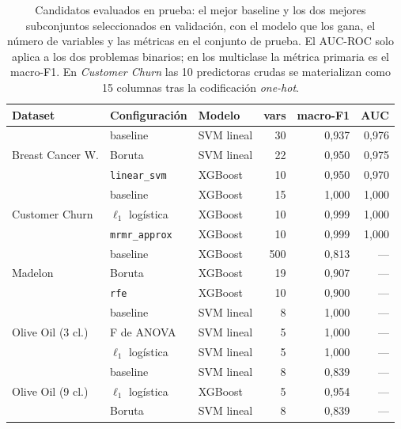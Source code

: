 \begin{table}[!htbp]
  \centering
  \caption[Candidatos evaluados en prueba por dataset y modelo]{Candidatos
    evaluados en prueba: el mejor baseline y los dos mejores subconjuntos
    seleccionados en validación, con el modelo que los gana, el número de
    variables y las métricas en el conjunto de prueba. El AUC-ROC solo
    aplica a los dos problemas binarios; en los multiclase la métrica
    primaria es el macro-F1. En \textit{Customer Churn} las 10 predictoras
    crudas se materializan como 15 columnas tras la codificación
    \textit{one-hot}.}
  \label{tab:candidatos}
  \footnotesize
  \begin{tabular}{lllrrr}
    \toprule
    Dataset & Configuración & Modelo & vars & macro-F1 & AUC \\
    \midrule
    \multirow{3}{*}{Breast Cancer W.}
      & baseline      & SVM lineal & 30 & 0{,}937 & 0{,}976 \\
      & Boruta        & SVM lineal & 22 & 0{,}950 & 0{,}975 \\
      & \texttt{linear\_svm} & XGBoost & 10 & 0{,}950 & 0{,}970 \\
    \midrule
    \multirow{3}{*}{Customer Churn}
      & baseline      & XGBoost & 15 & 1{,}000 & 1{,}000 \\
      & $\ell_1$ logística & XGBoost & 10 & 0{,}999 & 1{,}000 \\
      & \texttt{mrmr\_approx} & XGBoost & 10 & 0{,}999 & 1{,}000 \\
    \midrule
    \multirow{3}{*}{Madelon}
      & baseline      & XGBoost & 500 & 0{,}813 & --- \\
      & Boruta        & XGBoost & 19 & 0{,}907 & --- \\
      & \texttt{rfe}  & XGBoost & 10 & 0{,}900 & --- \\
    \midrule
    \multirow{3}{*}{Olive Oil (3 cl.)}
      & baseline      & SVM lineal & 8 & 1{,}000 & --- \\
      & F de ANOVA    & SVM lineal & 5 & 1{,}000 & --- \\
      & $\ell_1$ logística & SVM lineal & 5 & 1{,}000 & --- \\
    \midrule
    \multirow{3}{*}{Olive Oil (9 cl.)}
      & baseline      & SVM lineal & 8 & 0{,}839 & --- \\
      & $\ell_1$ logística & XGBoost & 5 & 0{,}954 & --- \\
      & Boruta        & SVM lineal & 8 & 0{,}839 & --- \\
    \bottomrule
  \end{tabular}
\end{table}
\FloatBarrier

